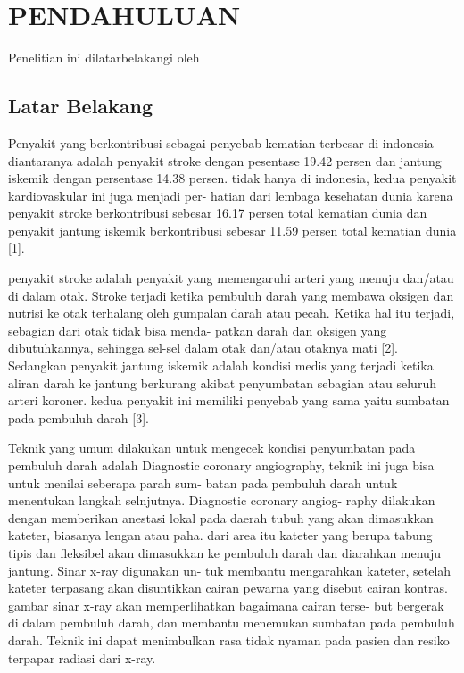 \chapter{PENDAHULUAN}
\label{chap:pendahuluan}


Penelitian ini dilatarbelakangi oleh \lipsum[1][1-5]

\section{Latar Belakang}
\label{sec:latarbelakang}

Penyakit yang berkontribusi sebagai penyebab kematian terbesar di indonesia diantaranya adalah penyakit stroke dengan pesentase 19.42 persen dan jantung iskemik dengan persentase 14.38 persen. tidak hanya di indonesia, kedua penyakit kardiovaskular ini juga menjadi per- hatian dari lembaga kesehatan dunia karena penyakit stroke berkontribusi sebesar 16.17 persen total kematian dunia dan penyakit jantung iskemik berkontribusi sebesar 11.59 persen total kematian dunia [1].

penyakit stroke adalah penyakit yang memengaruhi arteri yang menuju dan/atau di dalam otak. Stroke terjadi ketika pembuluh darah yang membawa oksigen dan nutrisi ke otak terhalang oleh gumpalan darah atau pecah. Ketika hal itu terjadi, sebagian dari otak tidak bisa menda- patkan darah dan oksigen yang dibutuhkannya, sehingga sel-sel dalam otak dan/atau otaknya mati [2]. Sedangkan penyakit jantung iskemik adalah kondisi medis yang terjadi ketika aliran darah ke jantung berkurang akibat penyumbatan sebagian atau seluruh arteri koroner. kedua penyakit ini memiliki penyebab yang sama yaitu sumbatan pada pembuluh darah [3].

Teknik yang umum dilakukan untuk mengecek kondisi penyumbatan pada pembuluh darah adalah Diagnostic coronary angiography, teknik ini juga bisa untuk menilai seberapa parah sum- batan pada pembuluh darah untuk menentukan langkah selnjutnya. Diagnostic coronary angiog- raphy dilakukan dengan memberikan anestasi lokal pada daerah tubuh yang akan dimasukkan kateter, biasanya lengan atau paha. dari area itu kateter yang berupa tabung tipis dan fleksibel akan dimasukkan ke pembuluh darah dan diarahkan menuju jantung. Sinar x-ray digunakan un- tuk membantu mengarahkan kateter, setelah kateter terpasang akan disuntikkan cairan pewarna yang disebut cairan kontras. gambar sinar x-ray akan memperlihatkan bagaimana cairan terse- but bergerak di dalam pembuluh darah, dan membantu menemukan sumbatan pada pembuluh darah. Teknik ini dapat menimbulkan rasa tidak nyaman pada pasien dan resiko terpapar radiasi dari x-ray.

